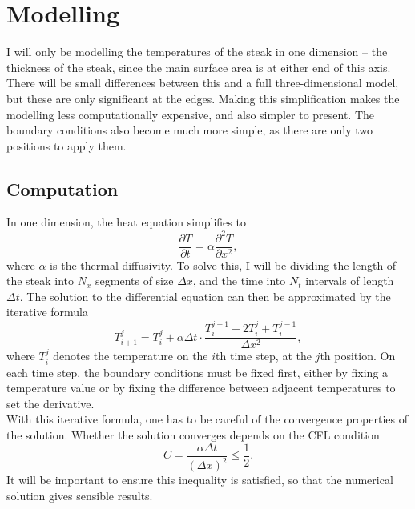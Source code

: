 \documentclass[11pt]{article}
\begin{document}
	\section{Modelling}
	
	I will only be modelling the temperatures of the steak in one dimension -- the thickness of the steak, since the main surface area is at either end of this axis. There will be small differences between this and a full three-dimensional model, but these are only significant at the edges. Making this simplification makes the modelling less computationally expensive, and also simpler to present. The boundary conditions also become much more simple, as there are only two positions to apply them.\\
	
	\subsection{Computation}
	
	In one dimension, the heat equation simplifies to
	\begin{equation}
		\frac{\partial T}{\partial t} = \alpha \frac{\partial^2 T}{\partial x^2},
	\end{equation}
	where $\alpha$ is the thermal diffusivity. To solve this, I will be dividing the length of the steak into $N_x$ segments of size $\Delta x$, and the time into $N_t$ intervals of length $\Delta t$. The solution to the differential equation can then be approximated by the iterative formula
	\begin{equation}
		T_{i+1}^j = T_i^j + \alpha\Delta t \cdot \frac{T_i^{j+1} - 2T_i^j + T_i^{j-1}}{\Delta x^2},
	\end{equation}
	where $T_i^j$ denotes the temperature on the $i$th time step, at the $j$th position. On each time step, the boundary conditions must be fixed first, either by fixing a temperature value or by fixing the difference between adjacent temperatures to set the derivative. \\
	
	With this iterative formula, one has to be careful of the convergence properties of the solution. Whether the solution converges depends on the CFL condition\cite{cfl_cond}
	\begin{equation}
		C = \frac{\alpha \Delta t}{(\Delta x)^2} \leq \frac{1}{2}.
	\end{equation}
	It will be important to ensure this inequality is satisfied, so that the numerical solution gives sensible results. \\
	
\end{document}
